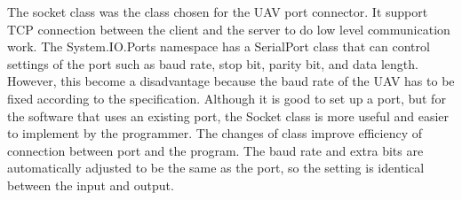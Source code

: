 The socket class was the class chosen for the UAV port connector. 
It support TCP connection between the client and the server to do low level communication work\cite{xiaX}. 
The System.IO.Ports namespace has a SerialPort class that can control settings of the port such as baud rate, stop bit, parity bit, and data length.
However, this become a disadvantage because the baud rate of the UAV has to be fixed according to the specification. 
Although it is good to set up a port, but for the software that uses an existing port, the Socket class is more useful and easier to implement by the programmer. 
The changes of class improve efficiency of connection between port and the program. 
The baud rate and extra bits are automatically adjusted to be the same as the port, so the setting is identical between the input and output.
